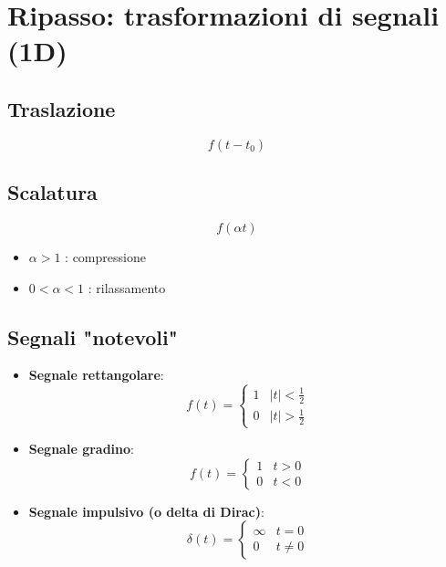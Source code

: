 \documentclass[12pt, a4paper]{report}
\begin{document}
\section{Ripasso: trasformazioni di segnali (1D)}
\subsection{Traslazione}
\begin{equation*}
    f(t-t_{0})
\end{equation*}
\subsection{Scalatura}
\begin{equation*}
    f(\alpha t)
\end{equation*}
\begin{itemize}
    \item $\alpha > 1$ : compressione
    \item $0 < \alpha < 1$ : rilassamento
\end{itemize}
\subsection{Segnali "notevoli"}
\begin{itemize}
    \item \textbf{Segnale rettangolare}: \begin{equation*}
        f(t) = \begin{cases} 
        1 & \lvert t \rvert < \frac{1}{2} \\
        0 & \lvert t \rvert > \frac{1}{2}
    \end{cases}
    \end{equation*}
    \item \textbf{Segnale gradino}: \begin{equation*}
        f(t) = \begin{cases} 
        1 & t > 0 \\
        0 & t < 0
    \end{cases}
    \end{equation*}
    \item \textbf{Segnale impulsivo (o delta di Dirac)}: \begin{equation*}
        \delta(t) = \begin{cases} 
        \infty & t = 0 \\
        0 & t \neq 0
    \end{cases}
    \end{equation*}
\end{itemize}
\end{document}
